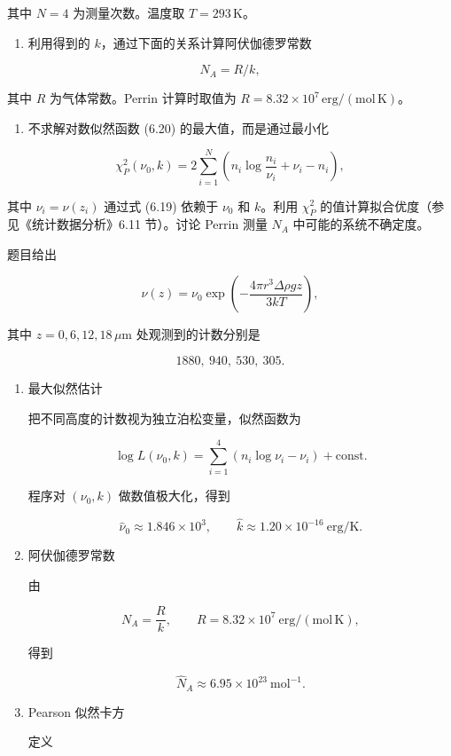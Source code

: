 \begin{question}
其中 \(N=4\) 为测量次数。温度取 \(T=293\,\mathrm{K}\)。

\begin{enumerate}[start=2]
\item
  利用得到的 \(k\)，通过下面的关系计算阿伏伽德罗常数
\end{enumerate}

\[
N_A=R/k,
\]

其中 \(R\) 为气体常数。Perrin 计算时取值为
\(R=8.32\times10^7\,\mathrm{erg/(mol\,K)}\)。

\begin{enumerate}[start=3]
\item
  不求解对数似然函数 (6.20) 的最大值，而是通过最小化
\end{enumerate}

\[
\chi_P^2(\nu_0,k)=2\sum_{i=1}^{N}\left(n_i\log\frac{n_i}{\nu_i}+\nu_i-n_i\right),
\]

其中 \(\nu_i=\nu(z_i)\) 通过式 (6.19) 依赖于 \(\nu_0\) 和 \(k\)。利用
\(\chi_P^2\) 的值计算拟合优度（参见《统计数据分析》6.11 节）。讨论
Perrin 测量 \(N_A\) 中可能的系统不确定度。
\begin{solution}
题目给出

\[
\nu(z)=\nu_0\exp\left(-\frac{4\pi r^3\Delta\rho gz}{3kT}\right),
\]

其中 \(z=0,6,12,18\,\mu\mathrm m\) 处观测到的计数分别是

\[
1880,\ 940,\ 530,\ 305.
\]

\begin{enumerate}
\item 最大似然估计

把不同高度的计数视为独立泊松变量，似然函数为

\[
\log L(\nu_0,k)=\sum_{i=1}^4(n_i\log\nu_i-\nu_i)+\text{const}.
\]

程序对 \((\nu_0,k)\) 做数值极大化，得到

\[
\hat\nu_0\approx1.846\times10^3,
\qquad
\hat k\approx1.20\times10^{-16}\ \mathrm{erg/K}.
\]

\item 阿伏伽德罗常数

由

\[
N_A=\frac{R}{k},\qquad R=8.32\times10^7\ \mathrm{erg/(mol\,K)},
\]

得到

\[
\hat N_A\approx6.95\times10^{23}\ \mathrm{mol}^{-1}.
\]

\item Pearson 似然卡方

定义


\end{enumerate}
\end{solution}
\end{question}
